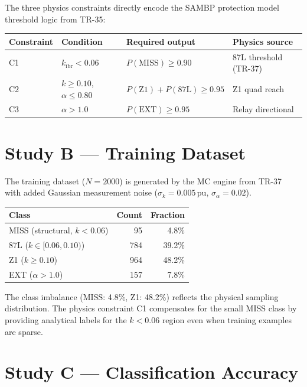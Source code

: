 \documentclass[11pt,a4paper]{article}
\begin{document}
\noindent
The three physics constraints directly encode the SAMBP protection model
threshold logic from TR-35:

\begin{center}
\begin{tabular}{@{}llll@{}}
\toprule
Constraint & Condition & Required output & Physics source \\
\midrule
C1 & $k_\mathrm{ibr}<0.06$ & $P(\text{MISS})\geq0.90$ & 87L threshold (TR-37) \\
C2 & $k\geq0.10$, $\alpha\leq0.80$ & $P(\text{Z1})+P(\text{87L})\geq0.95$ & Z1 quad reach \\
C3 & $\alpha>1.0$ & $P(\text{EXT})\geq0.95$ & Relay directional \\
\bottomrule
\end{tabular}
\end{center}

\section{Study B --- Training Dataset}
\label{sec:studyB}

The training dataset ($N=2000$) is generated by the MC engine from
TR-37~\cite{SAMBP_TR37} with added Gaussian measurement noise
($\sigma_k=0.005$\,pu, $\sigma_\alpha=0.02$).

\begin{center}
\begin{tabular}{@{}lrr@{}}
\toprule
Class & Count & Fraction \\
\midrule
MISS (structural, $k<0.06$) & 95 & 4.8\% \\
87L ($k\in[0.06,0.10)$) & 784 & 39.2\% \\
Z1 ($k\geq0.10$) & 964 & 48.2\% \\
EXT ($\alpha>1.0$) & 157 & 7.8\% \\
\bottomrule
\end{tabular}
\end{center}

\medskip\noindent
The class imbalance (MISS: 4.8\%, Z1: 48.2\%) reflects the physical sampling
distribution.  The physics constraint C1 compensates for the small MISS class
by providing analytical labels for the $k<0.06$ region even when training
examples are sparse.

\section{Study C --- Classification Accuracy}
\label{sec:studyC}
\end{document}
